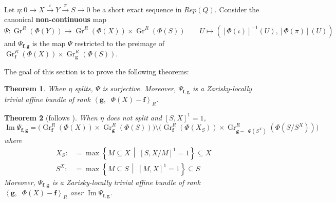 \documentclass[reqno,11pt]{amsart}
\numberwithin{equation}{section}
\theoremstyle{plain}
\newtheorem{theorem}{Theorem}[section]
\theoremstyle{plain}
\numberwithin{equation}{section}
\theoremstyle{remark}
\DeclareMathOperator{\Img}{\operatorname{Im}}
\DeclareMathOperator{\dimv}{\operatorname{\underline{\mathbf{dim}}}}
\newcommand{\Grr}{\operatorname{Gr}^{R}}
\newcommand{\dimvec}[1]{\mathbf{#1}}
\begin{document}
Let $\eta: 0\longrightarrow X \stackrel{\iota}{\longrightarrow} Y \stackrel{\pi}{\longrightarrow} S \longrightarrow 0$ be a short exact sequence in $Rep(Q)$. Consider the canonical \textbf{non-continuous} map
$$\Psi: \Grr(\Phi(Y)) \longrightarrow \Grr(\Phi(X)) \times \Grr(\Phi(S)) \qquad U \longmapsto \left([\Phi(\iota)]^{-1}(U),[\Phi(\pi)](U)   \right)$$
and  $\Psi_{\dimvec{f},\dimvec{g}}$ is the map $\Psi$ restricted to the preimage of $\Grr_{\dimvec{f}}(\Phi(X)) \times \Grr_{\dimvec{g}}(\Phi(S))$.

The goal of this section is to prove the following theorems:
\begin{theorem}\label{thm:main1}
	When $\eta$ splits, $\Psi$ is surjective. Moreover, $\Psi_{\dimvec{f},\dimvec{g}}$ is a Zarisky-locally trivial affine bundle of rank $\left< \dimvec{g},\dimv \Phi(X) - \dimvec{f}\right>_R$.
\end{theorem}
\begin{theorem}[follows {\cite[Theorem 32]{irelli2019cell}}]\label{thm:main2}
	When $\eta$ does not split and $[S,X]^1=1$, 
	$$\Img \Psi_{\dimvec{f},\dimvec{g}} = \bigg(\Grr_{\dimvec{f}}(\Phi(X)) \times \Grr_{\dimvec{g}}(\Phi(S)) \bigg) \setminus \bigg(\Grr_{\dimvec{f}}(\Phi(X_S)) \times \Grr_{\dimvec{g}-\dimv \Phi(S^X)}\left(\Phi(S/S^X)\right) \bigg)$$
	where 
	\begin{equation*}
	\begin{aligned}
	X_S:&= \max \left\{ M \subseteq X \,\middle|\; [S,X/M ]^1=1 \right\} \subseteq X\\
	S^X:&= \max \left\{ M \subseteq S \,\middle|\; [M,X]^1=1 \right\} \subseteq S
	\end{aligned}
	\end{equation*}
Moreover, $\Psi_{\dimvec{f},\dimvec{g}}$ is a Zarisky-locally trivial affine bundle of rank $\left< \dimvec{g},\dimv \Phi(X) - \dimvec{f}\right>_R$ over $\Img \Psi_{\dimvec{f},\dimvec{g}}$.
\end{theorem}
\end{document}
